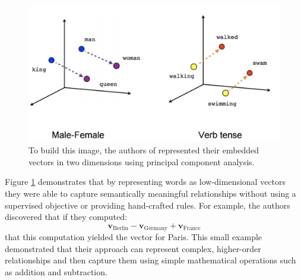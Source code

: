 \documentclass[../thesis.tex]{subfiles}
\begin{document}
\begin{figure}
    \centering
    \includegraphics[width=\linewidth]{images/word2vec.pdf}
    \caption[Word2Vec Example]{To build this image, the authors of \cite{mikolov2013distributed} represented their embedded vectors in two dimensions using principal component analysis.}
    \label{fig:word2vec}
\end{figure}
Figure \ref{fig:word2vec} demonstrates that by representing words as low-dimensional vectors they were able to capture semantically meaningful relationships without using a supervised objective or providing hand-crafted rules. For example, the authors discovered that if they computed:
\begin{equation*}
    \mathbf{v}_{\text{Berlin}} - \mathbf{v}_{\text{Germany}} + \mathbf{v}_{\text{France}}
\end{equation*}
that this computation yielded the vector for Paris. This small example demonstrated that their approach can represent complex, higher-order relationships and then capture them using simple mathematical operations such as addition and subtraction. 
\end{document}
